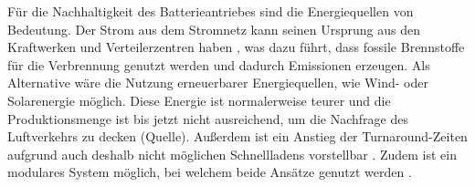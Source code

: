 Für die Nachhaltigkeit des Batterieantriebes sind die Energiequellen von Bedeutung. 
Der Strom aus dem Stromnetz kann seinen Ursprung aus 
den Kraftwerken und Verteilerzentren haben \cite{dalmia2022powering},
was dazu führt, dass fossile Brennstoffe für die Verbrennung genutzt 
werden und dadurch Emissionen erzeugen. 
Als Alternative wäre die Nutzung erneuerbarer Energiequellen, 
wie Wind- oder Solarenergie möglich. 
Diese Energie ist normalerweise teurer und die Produktionsmenge 
ist bis jetzt nicht ausreichend, um die Nachfrage des Luftverkehrs zu decken (Quelle).
Außerdem ist ein Anstieg der Turnaround-Zeiten aufgrund 
auch deshalb nicht möglichen Schnellladens vorstellbar \cite{avogadro2024demystifying}.
Zudem ist ein modulares System möglich, bei welchem beide Ansätze genutzt werden \cite{salucci2020optimal}.

